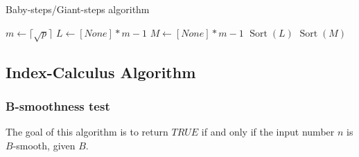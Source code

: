 \begin{algorithm}
\caption{Baby-steps/Giant-steps algorithm}\label{alg:baby_steps_giant_steps}
    \;
    $m \gets \lceil \sqrt{p} \rceil$\;
    $L \gets [None] * m - 1$\;
    $M \gets [None] * m - 1$\;
    $\operatorname{Sort}(L)$ \;
    $\operatorname{Sort}(M)$\;
    \;
     
\end{algorithm}

\subsection{Index-Calculus Algorithm}
\subsubsection{B-smoothness test}
The goal of this algorithm is to return $TRUE$ if and only if the input number $n$ is $B$-smooth, given $B$.

